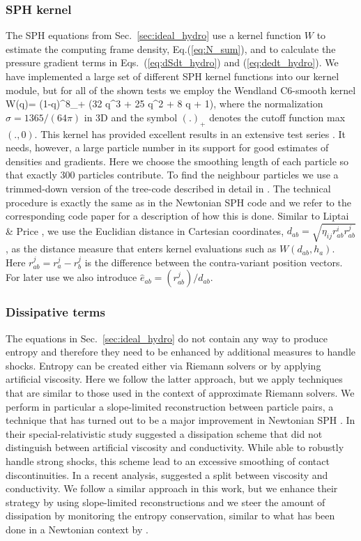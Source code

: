 \documentclass[useAMS,usenatbib]{iopart}
\begin{document}
\subsubsection{SPH kernel}
\label{sec:SPH_kernel}
The SPH equations from Sec.~\ref{sec:ideal_hydro}  use a kernel function $W$ to
estimate the computing frame density, Eq.(\ref{eq:N_sum}), and to calculate the pressure gradient terms 
in Eqs.~(\ref{eq:dSdt_hydro}) and (\ref{eq:dedt_hydro}). We
have implemented a large set of different SPH kernel functions into our kernel module, but for 
all of the shown tests we employ the Wendland C6-smooth kernel \cite{wendland95}
\be
W(q)=  (1-q)^8_+ (32 q^3 + 25 q^2 + 8 q + 1),
\ee
where the normalization $\sigma= 1365/(64 \pi)$ in 3D and the symbol $(.)_+$ denotes the cutoff function max$(.,0)$.  This kernel has provided excellent results 
in an extensive test series \cite{rosswog15b,rosswog20a}. It needs, however,  a large particle number in 
its support for good estimates of densities and gradients. Here we choose the smoothing length 
of each particle so that exactly 300 particles contribute.  To find the neighbour particles
we use a trimmed-down version of the tree-code described in detail in \cite{gafton11}. The technical
procedure is exactly the same as in the Newtonian SPH code \Ma and we refer to the corresponding code
paper \cite{rosswog20a} for a description of how this is done.
Similar to Liptai \& Price \cite{liptai19}, we use the Euclidian distance in Cartesian coordinates,
$d_{ab}= \sqrt{\eta_{ij} r^i_{ab} r^j_{ab}}$, as the
distance measure  that enters kernel evaluations such as $W(d_{ab},h_a)$. Here 
$r^j_{ab}= r^j_a - r^j_b$ is the difference between the contra-variant position vectors. 
For later use we also introduce $\hat{e}_{ab}= (r^j_{ab})/d_{ab}$.

\subsubsection{Dissipative terms}
The equations  in Sec.~\ref{sec:ideal_hydro} do not contain any way
to produce entropy and therefore they need to be enhanced by additional measures
to handle shocks. 
Entropy can be created either via  Riemann solvers or by applying artificial viscosity. Here we follow the latter 
approach, but we apply  techniques that are similar to those used in the context of
approximate Riemann solvers. We perform in particular a slope-limited reconstruction between 
particle pairs, a technique that has turned out to be a major improvement in Newtonian SPH \cite{rosswog20a}.
In their special-relativistic study \cite{chow97} suggested a dissipation scheme that did not distinguish
between artificial viscosity and conductivity. While able to robustly handle strong shocks, this scheme lead
to an excessive smoothing of contact discontinuities. In a recent analysis,  \cite{liptai19} suggested
a split between viscosity and conductivity. We follow a similar approach in this work, 
but we enhance their strategy by using slope-limited reconstructions and we steer 
the amount of dissipation by monitoring the entropy conservation, similar to what has been done
in a Newtonian context by \cite{rosswog20b}.\\
\end{document}
